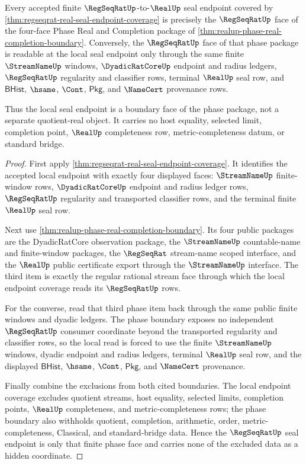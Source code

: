 \begin{theorem}
\label{thm:regseqrat-real-seal-endpoint-phase-boundary}
Every accepted finite $\RegSeqRatUp$-to-$\RealUp$ seal endpoint covered by
\autoref{thm:regseqrat-real-seal-endpoint-coverage} is precisely the
$\RegSeqRatUp$ face of the four-face Phase Real and Completion package of
\autoref{thm:realup-phase-real-completion-boundary}. Conversely, the
$\RegSeqRatUp$ face of that phase package is readable at the local seal
endpoint only through the same finite $\StreamNameUp$ windows,
$\DyadicRatCoreUp$ endpoint and radius ledgers, $\RegSeqRatUp$ regularity and
classifier rows, terminal $\RealUp$ seal row, and $\mathsf{BHist}$, $\hsame$,
$\Cont$, $\mathsf{Pkg}$, and $\NameCert$ provenance rows.

Thus the local seal endpoint is a boundary face of the phase package, not a
separate quotient-real object. It carries no host equality, selected limit,
completion point, $\RealUp$ completeness row, metric-completeness datum, or
standard bridge.
\end{theorem}
\begin{proof}
First apply \autoref{thm:regseqrat-real-seal-endpoint-coverage}. It identifies
the accepted local endpoint with exactly four displayed faces:
$\StreamNameUp$ finite-window rows, $\DyadicRatCoreUp$ endpoint and radius
ledger rows, $\RegSeqRatUp$ regularity and transported classifier rows, and the
terminal finite $\RealUp$ seal row.

Next use \autoref{thm:realup-phase-real-completion-boundary}. Its four public
packages are the DyadicRatCore observation package, the $\StreamNameUp$
countable-name and finite-window packages, the $\RegSeqRat$ stream-name scoped
interface, and the $\RealUp$ public certificate export through the
$\StreamNameUp$ interface. The third item is exactly the regular rational
stream face through which the local endpoint coverage reads its
$\RegSeqRatUp$ rows.

For the converse, read that third phase item back through the same public
finite windows and dyadic ledgers. The phase boundary exposes no independent
$\RegSeqRatUp$ consumer coordinate beyond the transported regularity and
classifier rows, so the local read is forced to use the finite
$\StreamNameUp$ windows, dyadic endpoint and radius ledgers, terminal
$\RealUp$ seal row, and the displayed $\mathsf{BHist}$, $\hsame$, $\Cont$,
$\mathsf{Pkg}$, and $\NameCert$ provenance.

Finally combine the exclusions from both cited boundaries. The local endpoint
coverage excludes quotient streams, host equality, selected limits, completion
points, $\RealUp$ completeness, and metric-completeness rows; the phase
boundary also withholds quotient, completion, arithmetic, order,
metric-completeness, Classical, and standard-bridge data. Hence the
$\RegSeqRatUp$ seal endpoint is only that finite phase face and carries none of
the excluded data as a hidden coordinate.
\end{proof}

